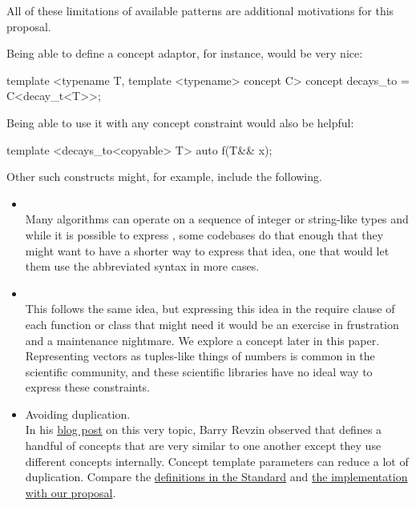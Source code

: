 \documentclass{wg21}
\begin{document}
All of these limitations of available patterns are additional motivations for this proposal.


Being able to define a concept adaptor, for instance, would be very nice:

\begin{colorblock}
template <typename T, template <typename> concept C>
concept decays_to = C<decay_t<T>>;
\end{colorblock}

Being able to use it with any concept constraint would also be helpful:

\begin{colorblock}
template <decays_to<copyable> T>
auto f(T&& x);
\end{colorblock}


Other such constructs might, for example, include the following.
\begin{itemize}
\item {}\\
    Many algorithms can operate on a sequence of integer or string-like types and while it is possible to express
    , some codebases do that enough that they might want to have a shorter way to express that idea,
    one that would let them use the abbreviated syntax in more cases.

\item {} \\
    This follows the same idea, but expressing this idea in the require clause of each function or class that might need it would be an exercise in frustration and a maintenance nightmare. We explore a  concept later in this paper.
    Representing vectors as tuples-like things of numbers is common in the scientific community, and these scientific libraries have no ideal way to express these constraints.

\item Avoiding duplication.\\
    In his \href{https://brevzin.github.io/c++/2019/01/09/concept-templates/}{blog post} on this very topic, Barry Revzin observed that  defines a handful of concepts that are very
    similar to one another except they use different concepts internally. Concept template parameters can reduce a lot of duplication.
    Compare the \href{https://eel.is/c++draft/indirectcallable.indirectinvocable}{definitions in the Standard} and \href{https://godbolt.org/z/ohKsoKh9G}{the implementation with our proposal}.
\end{itemize}
\end{document}
